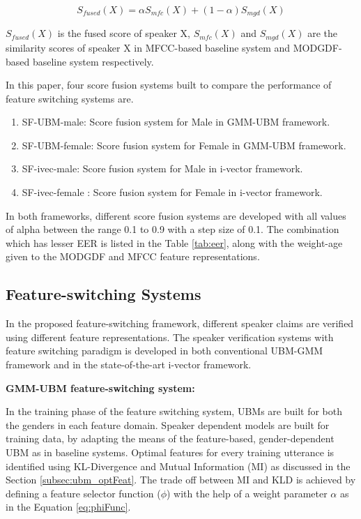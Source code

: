 \documentclass{article}
\begin{document}
	\begin{equation}
	 S_{fused}\left( X \right) = \alpha S_{mfc}\left( X \right) + (1-\alpha)S_{mgd}\left( X \right)
	\label{eq:scoreFuse}
	\end{equation}
	
	$S_{fused}\left( X \right)$ is the fused score of speaker X,  $S_{mfc}\left( X \right)$ and $S_{mgd}\left( X \right)$ are the similarity scores of speaker X in MFCC-based baseline system and MODGDF-based baseline system respectively. 

\vspace{0.25 cm}		 
	In this paper, four score fusion systems built to compare the performance of feature switching systems are. 
	\begin{enumerate}
	\item SF-UBM-male: Score fusion system for Male in GMM-UBM framework.
	\item SF-UBM-female: Score fusion system for Female in GMM-UBM framework.
	\item SF-ivec-male: Score fusion system for Male in i-vector framework.
	\item SF-ivec-female	: Score fusion system for Female in i-vector framework.
	\end{enumerate}
	In both frameworks, different score fusion systems are developed with all values of alpha between the range 0.1 to 0.9 with a step size of 0.1.  The combination which has lesser EER is listed in the Table \ref{tab:eer}, along with the weight-age given to the MODGDF and MFCC feature representations.
	
\subsection{Feature-switching Systems}
\label{subsec:featSwitch}

In the proposed feature-switching framework, different speaker claims are verified using different feature representations. The speaker verification systems with feature switching paradigm is developed in both conventional UBM-GMM framework and in the state-of-the-art i-vector framework.

\vspace{0.25 cm}	
\textbf{GMM-UBM feature-switching system:}

In the training phase of the feature switching system, UBMs are built for both the genders in each feature domain. Speaker dependent models are built for training data, by adapting the means of the feature-based, gender-dependent UBM as in baseline systems. Optimal features for every training utterance is identified using KL-Divergence and Mutual Information (MI) as  discussed in the Section \ref{subsec:ubm_optFeat}. The trade off between MI and KLD is achieved by defining a feature selector function ($\phi$) with the help of a weight parameter $\alpha$ as in the Equation \ref{eq:phiFunc}. 
\end{document}
